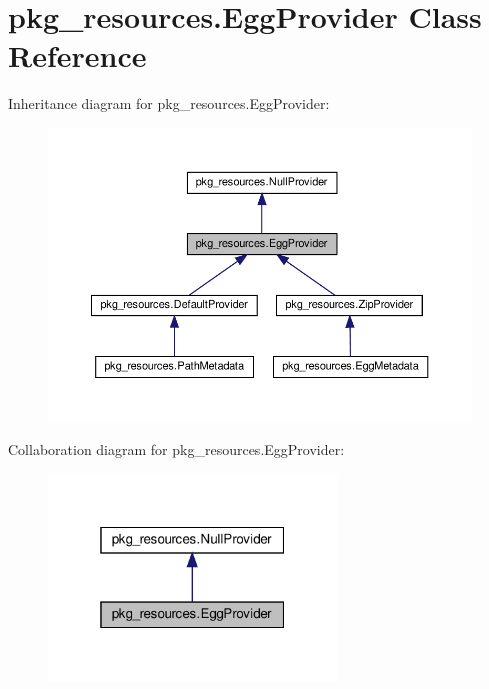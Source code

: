 \hypertarget{classpkg__resources_1_1EggProvider}{}\section{pkg\+\_\+resources.\+Egg\+Provider Class Reference}
\label{classpkg__resources_1_1EggProvider}


Inheritance diagram for pkg\+\_\+resources.\+Egg\+Provider\+:
\nopagebreak
\begin{figure}[H]
\begin{center}
\leavevmode
\includegraphics[width=350pt]{classpkg__resources_1_1EggProvider__inherit__graph}
\end{center}
\end{figure}


Collaboration diagram for pkg\+\_\+resources.\+Egg\+Provider\+:
\nopagebreak
\begin{figure}[H]
\begin{center}
\leavevmode
\includegraphics[width=217pt]{classpkg__resources_1_1EggProvider__coll__graph}
\end{center}
\end{figure}
